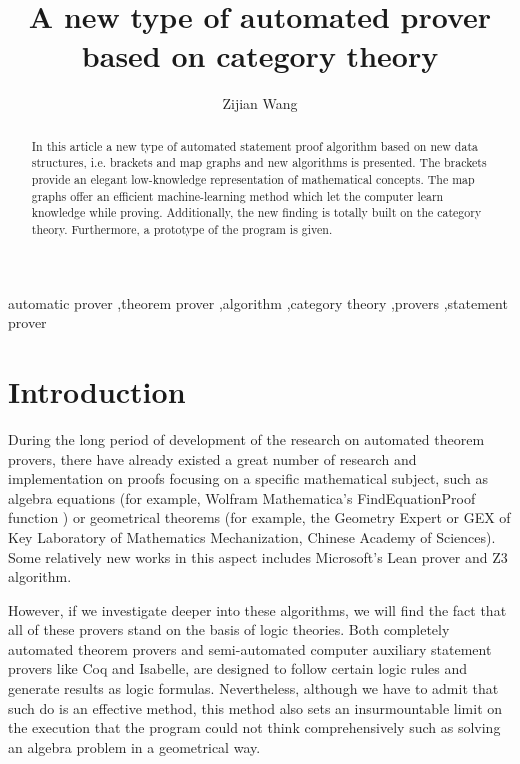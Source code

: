 \documentclass[preprint]{elsarticle}
\numberwithin{theorem}{section}	%
\numberwithin{axiom}{section}	%
\numberwithin{definition}{section}	%
\begin{document}
\begin{frontmatter}
	\title{A new type of automated prover based on category theory}
	\author[1]{Zijian Wang}
	
	
	
	\begin{abstract}
	In this article a new type of automated statement proof algorithm based on new data structures, i.e. brackets and map graphs
	and new algorithms is presented. The brackets provide an elegant low-knowledge representation of mathematical concepts. The map graphs offer an efficient machine-learning method which let the computer learn knowledge while proving. Additionally, the new finding is totally built on the category theory. Furthermore, a prototype of the program is given.
	\end{abstract}
	
	\begin{keyword}
		automatic prover \sep theorem prover \sep algorithm \sep category theory \sep provers \sep statement prover
	\end{keyword}
\end{frontmatter}

\section{Introduction}
During the long period of development of the research on automated theorem provers, there have already existed a great number of research and implementation on proofs focusing on a specific mathematical subject, such as algebra equations (for example, Wolfram Mathematica{'}s FindEquationProof function \cite{Wolfram2019}) or geometrical theorems (for example, the Geometry Expert or GEX \cite{Gao1998} of Key Laboratory of Mathematics Mechanization, Chinese Academy of Sciences). Some relatively new works in this aspect includes Microsoft{'}s Lean prover \cite{Moura2021} and Z3 \cite{Moura2008} algorithm.

However, if we investigate deeper into these algorithms, we will find the fact that all of these provers stand on the basis of logic theories. Both completely automated theorem provers and semi-automated computer auxiliary statement provers like Coq and Isabelle, are designed to follow certain logic rules and generate results as logic formulas. Nevertheless, although we have to admit that such do is an effective method, this method also sets an insurmountable limit on the execution that the program could not think comprehensively such as solving an algebra problem in a geometrical way.
\end{document}
